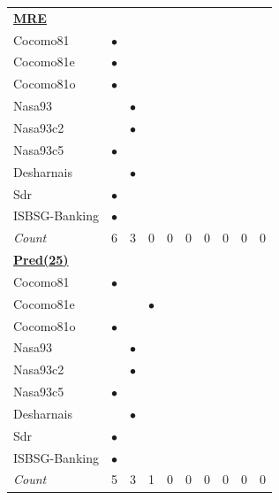 \documentclass{sig-alternate}
\begin{document}
\begin{figure}[!t]
\begin{tabular}{lccccccccc}
\multicolumn{10}{l}{  \underline{{\bf MRE}}}	\\
Cocomo81	&	$\bullet$	&		&		&		&		&		&		&		&		\\
Cocomo81e	&	$\bullet$	&		&		&		&		&		&		&		&		\\
Cocomo81o	&	$\bullet$	&		&		&		&		&		&		&		&		\\
Nasa93	&		&	$\bullet$	&		&		&		&		&		&		&		\\
Nasa93c2	&		&	$\bullet$	&		&		&		&		&		&		&		\\
Nasa93c5	&	$\bullet$	&		&		&		&		&		&		&		&		\\
Desharnais	&		&	$\bullet$	&		&		&		&		&		&		&		\\
Sdr	&	$\bullet$	&		&		&		&		&		&		&		&		\\
ISBSG-Banking	&	$\bullet$	&		&		&		&		&		&		&		&		\\
\rowcolor{DarkGray}\em Count	&	6	&	3	&	0	&	0	&	0	&	0	&	0	&	0	&	0	\\

%
\hline\multicolumn{10}{l}{  \underline{{\bf Pred(25)}}}	\\
Cocomo81	&	$\bullet$	&		&		&		&		&		&		&		&		\\
Cocomo81e	&		&		&	$\bullet$	&		&		&		&		&		&		\\
Cocomo81o	&	$\bullet$	&		&		&		&		&		&		&		&		\\
Nasa93	&		&	$\bullet$	&		&		&		&		&		&		&		\\
Nasa93c2	&		&	$\bullet$	&		&		&		&		&		&		&		\\
Nasa93c5	&	$\bullet$	&		&		&		&		&		&		&		&		\\
Desharnais	&		&	$\bullet$	&		&		&		&		&		&		&		\\
Sdr	&	$\bullet$	&		&		&		&		&		&		&		&		\\
ISBSG-Banking	&	$\bullet$	&		&		&		&		&		&		&		&		\\
\rowcolor{DarkGray}\em Count	&	5	&	3	&	1	&	0	&	0	&	0	&	0	&	0	&	0	\\


\end{tabular}
\end{figure}
\end{document}

